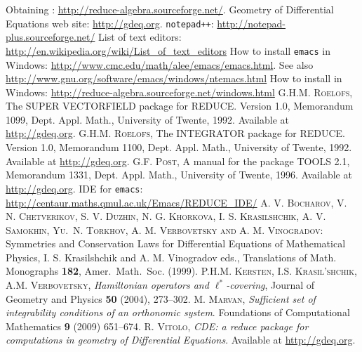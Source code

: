 \begin{thebibliography}{99}

 Obtaining \REDUCE: \url{http://reduce-algebra.sourceforge.net/}.
   Geometry of Differential Equations web site:
    \url{http://gdeq.org}.
   \texttt{notepad++}:
    \url{http://notepad-plus.sourceforge.net/}
   List of text editors:
    \url{http://en.wikipedia.org/wiki/List_of_text_editors}
   How to install \texttt{emacs} in Windows:
    \url{http://www.cmc.edu/math/alee/emacs/emacs.html}. See also
    \url{http://www.gnu.org/software/emacs/windows/ntemacs.html}
   How to install \REDUCE in Windows:
    \url{http://reduce-algebra.sourceforge.net/windows.html}
   \textsc{G.H.M. Roelofs}, The SUPER VECTORFIELD package for
    REDUCE. Version 1.0, Memorandum 1099, Dept. Appl. Math., University of
    Twente, 1992. Available at \url{http://gdeq.org}.
   \textsc{G.H.M. Roelofs}, The INTEGRATOR package for
    REDUCE. Version 1.0, Memorandum 1100, Dept. Appl. Math., University of
    Twente, 1992. Available at \url{http://gdeq.org}.
   \textsc{G.F. Post}, A manual for the package TOOLS 2.1,
    Memorandum 1331, Dept. Appl. Math., University of Twente, 1996. Available
    at \url{http://gdeq.org}.
   \REDUCE IDE for \texttt{emacs}:
    \url{http://centaur.maths.qmul.ac.uk/Emacs/REDUCE_IDE/}
   \textsc{A. V. Bocharov, V. N. Chetverikov, S. V.  Duzhin, N.
      G.  Khor{\cprime}kova, I. S.  Krasil{\cprime}shchik, A.  V.  Samokhin,
      Yu.\ N.  Torkhov, A. M. Verbovetsky and A. M.  Vinogradov}: Symmetries
    and Conservation Laws for Differential Equations of Mathematical Physics,
    I.  S.  Krasil{\cprime}shchik and A. M.  Vinogradov eds., Translations of
    Math.  Monographs \textbf{182}, Amer.\ Math.\ Soc. (1999).
   \textsc{P.H.M. Kersten, I.S. Krasil'shchik, A.M. Verbovetsky,}
    \emph{Hamiltonian operators and $\ell^*$-covering}, Journal of Geometry and
    Physics \textbf{50} (2004), 273--302.
   \textsc{M. Marvan}, \emph{Sufficient set of integrability
    conditions of an orthonomic system}.  Foundations of Computational
    Mathematics \textbf{9} (2009) 651--674.
   \textsc{R. Vitolo}, \emph{CDE: a reduce package for computations
  in geometry of Differential Equations}. Available at \url{http://gdeq.org}.
\end{thebibliography}

